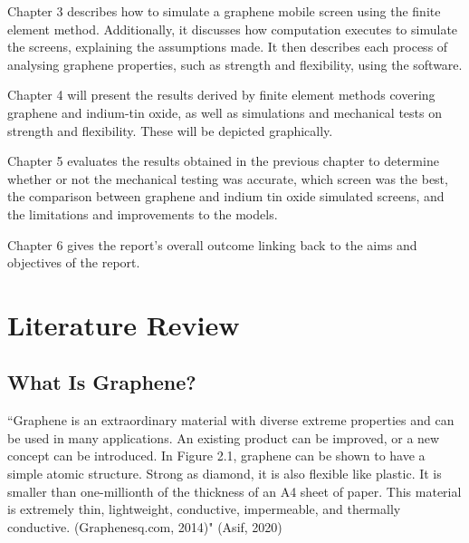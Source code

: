 \documentclass[a4paper,12pt]{article}
\numberwithin{equation}{section}
\numberwithin{figure}{section}
\begin{document}
\noindent Chapter 3 describes how to simulate a graphene mobile screen using the finite element method. Additionally, it discusses how computation executes to simulate the screens, explaining the assumptions made. It then describes each process of analysing graphene properties, such as strength and flexibility, using the software.\vspace{\baselineskip}

\noindent Chapter 4 will present the results derived by finite element methods covering graphene and indium-tin oxide, as well as simulations and mechanical tests on strength and flexibility. These will be depicted graphically.\vspace{\baselineskip}

\noindent Chapter 5 evaluates the results obtained in the previous chapter to determine whether or not the mechanical testing was accurate, which screen was the best, the comparison between graphene and indium tin oxide simulated screens, and the limitations and improvements to the models.\vspace{\baselineskip}

\noindent Chapter 6 gives the report's overall outcome linking back to the aims and objectives of the report.\vspace{\baselineskip}

\newpage
\section{Literature Review}

\subsection{What Is Graphene?}

\noindent ``Graphene is an extraordinary material with diverse extreme properties and can be used in many applications. An existing product can be improved, or a new concept can be introduced. In Figure 2.1, graphene can be shown to have a simple atomic structure. Strong as diamond, it is also flexible like plastic. It is smaller than one-millionth of the thickness of an A4 sheet of paper. This material is extremely thin, lightweight, conductive, impermeable, and thermally conductive. (Graphenesq.com, 2014)" (Asif, 2020)\vspace{\baselineskip}
\end{document}
